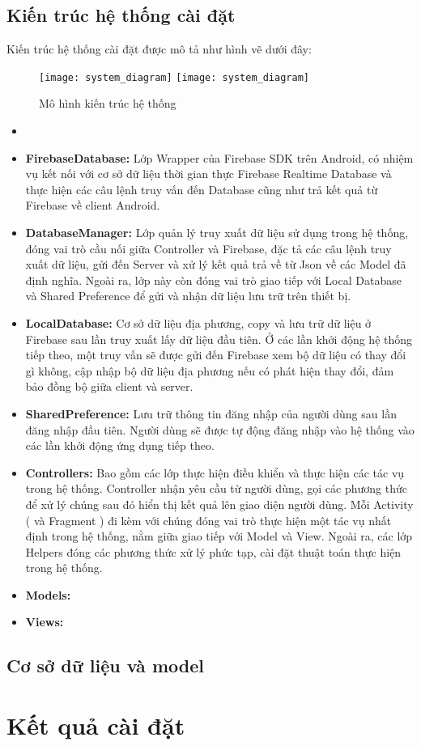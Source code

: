 \subsection{Kiến trúc hệ thống cài đặt}

Kiến trúc hệ thống cài đặt được mô tả như hình vẽ dưới đây:

\begin{figure}[H]
  \begin{center}
    \ifpdf
      \texttt{[image: system\_diagram]}
    \else
      \texttt{[image: system\_diagram]}
    \fi
    \caption{Mô hình kiến trúc hệ thống}
    \label{SystemDiagram}
  \end{center}
\end{figure}


\begin{itemize}
	\item[]
	\item \textbf{FirebaseDatabase: }Lớp Wrapper của Firebase SDK trên Android, có nhiệm vụ kết nối với cơ sở dữ liệu thời gian thực Firebase Realtime Database và thực hiện các câu lệnh truy vấn đến Database cũng như trả kết quả từ Firebase về client Android.
	\item \textbf{DatabaseManager: }Lớp quản lý truy xuất dữ liệu sử dụng trong hệ thống, đóng vai trò cầu nối giữa Controller và Firebase, đặc tả các câu lệnh truy xuất dữ liệu, gửi đến Server và xử lý kết quả trả về từ Json về các Model đã định nghĩa. Ngoài ra, lớp này còn đóng vai trò giao tiếp với Local Database và Shared Preference để gửi và nhận dữ liệu lưu trữ trên thiết bị. 
	\item \textbf{LocalDatabase: } Cơ sở dữ liệu địa phương, copy và lưu trữ dữ liệu ở Firebase sau lần truy xuất lấy dữ liệu đầu tiên. Ở các lần khởi động hệ thống tiếp theo, một truy vấn sẽ được gửi đến Firebase xem bộ dữ liệu có thay đổi gì không, cập nhập bộ dữ liệu địa phương nếu có phát hiện thay đổi, đảm bảo đồng bộ giữa client và server.
	\item \textbf{SharedPreference: } Lưu trữ thông tin đăng nhập của người dùng sau lần đăng nhập đầu tiên. Người dùng sẽ được tự động đăng nhập vào hệ thống vào các lần khởi động ứng dụng tiếp theo.
	\item \textbf{Controllers: } Bao gồm các lớp thực hiện điều khiển và thực hiện các tác vụ trong hệ thống. Controller nhận yêu cầu từ người dùng, gọi các phương thức để xử lý chúng sau đó hiển thị kết quả lên giao diện người dùng. Mỗi Activity ( và Fragment ) đi kèm với chúng đóng vai trò thực hiện một tác vụ nhất định trong hệ thống, nằm giữa giao tiếp với Model và View. Ngoài ra, các lớp Helpers đóng các phương thức xử lý phức tạp, cài đặt thuật toán thực hiện trong hệ thống.   	
	\item \textbf{Models: }
	\item \textbf{Views: }
\end{itemize}

\subsection{Cơ sở dữ liệu và model}
\section{Kết quả cài đặt}



